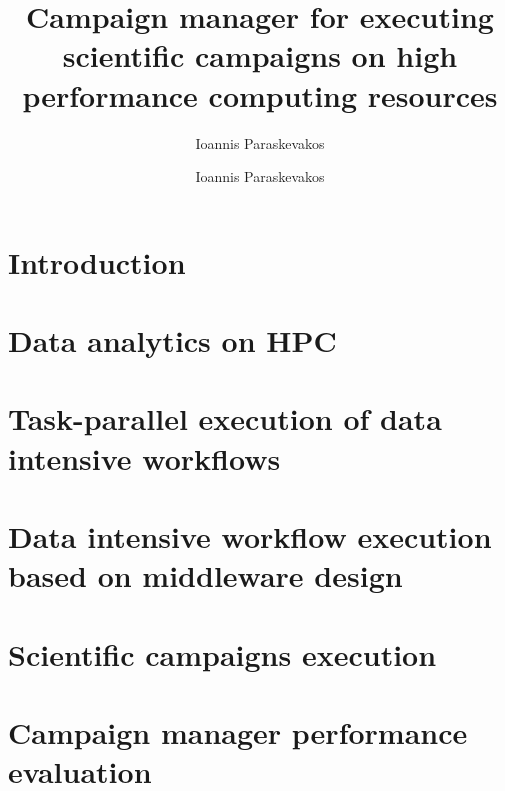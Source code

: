 \documentclass{ruthesis}
\begin{document}
\author{Ioannis Paraskevakos}
\copyrightp
\title{Campaign manager for executing scientific campaigns on high performance computing resources}
\author{Ioannis Paraskevakos}					
\figurespage
\tablespage

\abstract{}
\acknowledgements{}

\beforepreface
\afterpreface

\chapter{Introduction}

\label{ch:intro}

\chapter{Data analytics on HPC}

\chapter{Task-parallel execution of data intensive workflows}

\chapter{Data intensive workflow execution based on middleware design}

\chapter{Scientific campaigns execution}

\chapter{Campaign manager performance evaluation}



\end{document}
